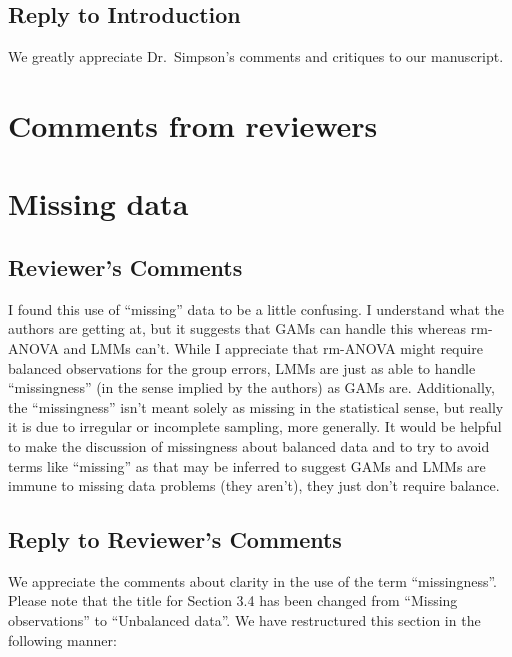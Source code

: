 \documentclass[
]{article}
\begin{document}
\hypertarget{section}{%
\subsection{\texorpdfstring{\textcolor{reviewersblue} {Reply to Introduction}}{}}\label{section}}

We greatly appreciate Dr.~Simpson's comments and critiques to our manuscript.

\hypertarget{comments-from-reviewers}{%
\section{Comments from reviewers}\label{comments-from-reviewers}}

\hypertarget{missing-data}{%
\section{Missing data}\label{missing-data}}

\hypertarget{reviewers-comments}{%
\subsection{Reviewer's Comments}\label{reviewers-comments}}

I found this use of ``missing'' data to be a little confusing. I understand what the authors are getting at, but it suggests that GAMs can handle this whereas rm-ANOVA and LMMs can't. While I appreciate that rm-ANOVA might require
balanced observations for the group errors, LMMs are just as able to handle ``missingness'' (in the sense implied by the authors) as GAMs are. Additionally, the ``missingness'' isn't meant solely as missing in the statistical sense, but really it is due to irregular or incomplete sampling, more generally.
It would be helpful to make the discussion of missingness about balanced data and to try to avoid terms like ``missing'' as that may be inferred to suggest GAMs and LMMs are immune to missing data problems (they aren't), they
just don't require balance.

\hypertarget{section-1}{%
\subsection{\texorpdfstring{\textcolor{reviewersblue} {Reply to Reviewer's Comments}}{}}\label{section-1}}

We appreciate the comments about clarity in the use of the term ``missingness''. Please note that the title for Section 3.4 has been changed from ``Missing observations'' to ``Unbalanced data''. We have restructured this section in the following manner:
\end{document}

